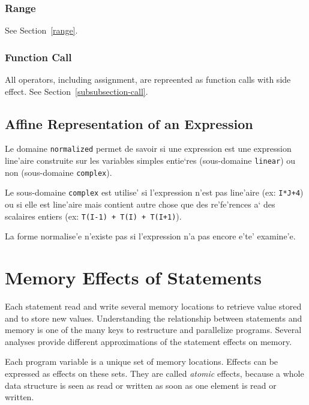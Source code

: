 {\subsubsection{Range}

See Section~\ref{range}.

\subsubsection{Function Call}

All operators, including assignment, are repreented as function calls
with side effect. See Section~\ref{subsubsection-call}.

\subsection{Affine Representation of an Expression}
\label{subsection-normalized}

{ Le domaine {\tt normalized} permet de savoir si une expression est une
expression line'aire construite sur les variables simples entie`res
(sous-domaine {\tt linear}) ou non (sous-domaine {\tt complex}).

Le sous-domaine {\tt complex} est utilise' si l'expression n'est pas
line'aire (ex: {\tt I*J+4}) ou si elle est line'aire mais contient autre
chose que des re'fe'rences a` des scalaires entiers (ex: {\tt T(I-1) +
T(I) + T(I+1)}).

La forme normalise'e n'existe pas si l'expression n'a pas encore e'te'
examine'e. }

\section{Memory Effects of Statements}
\label{effects}

Each statement read and write several memory locations to retrieve value
stored and to store new values. Understanding the relationship between
statements and memory is one of the many keys to restructure and
parallelize programs. Several analyses provide different approximations
of the statement effects on memory.

Each program variable is a unique set of memory locations. Effects can
be expressed as effects on these sets. They are called {\em atomic}
effects, because a whole data structure is seen as read or written as
soon as one element is read or written.

}
